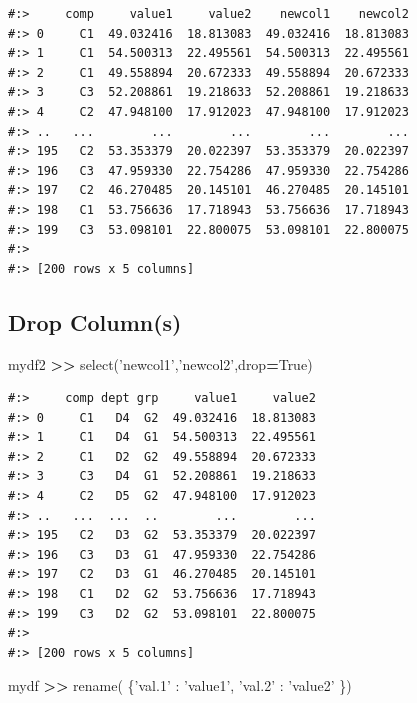 \documentclass[
]{book}
\newenvironment{Shaded}{\begin{snugshade}}{\end{snugshade}}
\newcommand{\NormalTok}[1]{#1}
\newcommand{\OperatorTok}[1]{\textcolor[rgb]{0.43,0.43,0.43}{\textbf{#1}}}
\newcommand{\StringTok}[1]{\textcolor[rgb]{0.5,0.5,0.5}{#1}}
\newcommand{\VariableTok}[1]{\textcolor[rgb]{0,0,0}{#1}}
\begin{document}
\begin{verbatim}
#:>     comp     value1     value2    newcol1    newcol2
#:> 0     C1  49.032416  18.813083  49.032416  18.813083
#:> 1     C1  54.500313  22.495561  54.500313  22.495561
#:> 2     C1  49.558894  20.672333  49.558894  20.672333
#:> 3     C3  52.208861  19.218633  52.208861  19.218633
#:> 4     C2  47.948100  17.912023  47.948100  17.912023
#:> ..   ...        ...        ...        ...        ...
#:> 195   C2  53.353379  20.022397  53.353379  20.022397
#:> 196   C3  47.959330  22.754286  47.959330  22.754286
#:> 197   C2  46.270485  20.145101  46.270485  20.145101
#:> 198   C1  53.756636  17.718943  53.756636  17.718943
#:> 199   C3  53.098101  22.800075  53.098101  22.800075
#:> 
#:> [200 rows x 5 columns]
\end{verbatim}

\hypertarget{drop-columns}{%
\subsection{Drop Column(s)}\label{drop-columns}}

\begin{Shaded}
\begin{Highlighting}[]
\NormalTok{mydf2 }\OperatorTok{>>}\NormalTok{ select(}\StringTok{'newcol1'}\NormalTok{,}\StringTok{'newcol2'}\NormalTok{,drop}\OperatorTok{=}\VariableTok{True}\NormalTok{)}
\end{Highlighting}
\end{Shaded}

\begin{verbatim}
#:>     comp dept grp     value1     value2
#:> 0     C1   D4  G2  49.032416  18.813083
#:> 1     C1   D4  G1  54.500313  22.495561
#:> 2     C1   D2  G2  49.558894  20.672333
#:> 3     C3   D4  G1  52.208861  19.218633
#:> 4     C2   D5  G2  47.948100  17.912023
#:> ..   ...  ...  ..        ...        ...
#:> 195   C2   D3  G2  53.353379  20.022397
#:> 196   C3   D3  G1  47.959330  22.754286
#:> 197   C2   D3  G1  46.270485  20.145101
#:> 198   C1   D2  G2  53.756636  17.718943
#:> 199   C3   D2  G2  53.098101  22.800075
#:> 
#:> [200 rows x 5 columns]
\end{verbatim}

\begin{Shaded}
\begin{Highlighting}[]
\NormalTok{mydf }\OperatorTok{>>}\NormalTok{ rename( \{}\StringTok{'val.1'}\NormalTok{ : }\StringTok{'value1'}\NormalTok{,}
                 \StringTok{'val.2'}\NormalTok{ : }\StringTok{'value2'}\NormalTok{ \})}
\end{Highlighting}
\end{Shaded}
\end{document}
